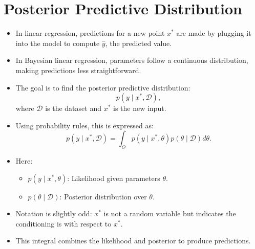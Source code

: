 
\section{Posterior Predictive Distribution}
\begin{itemize}
    \item In linear regression, predictions for a new point \(x^*\) are made by plugging it into the model to compute \(\hat{y}\), the predicted value.
    \item In Bayesian linear regression, parameters follow a continuous distribution, making predictions less straightforward.
    \item The goal is to find the posterior predictive distribution:
          \[
              p(y \mid x^*, \mathcal{D}),
          \]
          where \(\mathcal{D}\) is the dataset and \(x^*\) is the new input.
    \item Using probability rules, this is expressed as:
          \[
              p(y \mid x^*, \mathcal{D}) = \int_{\Theta} p(y \mid x^*, \theta) p(\theta \mid \mathcal{D}) d\theta.
          \]
    \item Here:
          \begin{itemize}
              \item \(p(y \mid x^*, \theta)\): Likelihood given parameters \(\theta\).
              \item \(p(\theta \mid \mathcal{D})\): Posterior distribution over \(\theta\).
          \end{itemize}
    \item Notation is slightly odd: \(x^*\) is not a random variable but indicates the conditioning is with respect to \(x^*\).
    \item This integral combines the likelihood and posterior to produce predictions.
\end{itemize}
